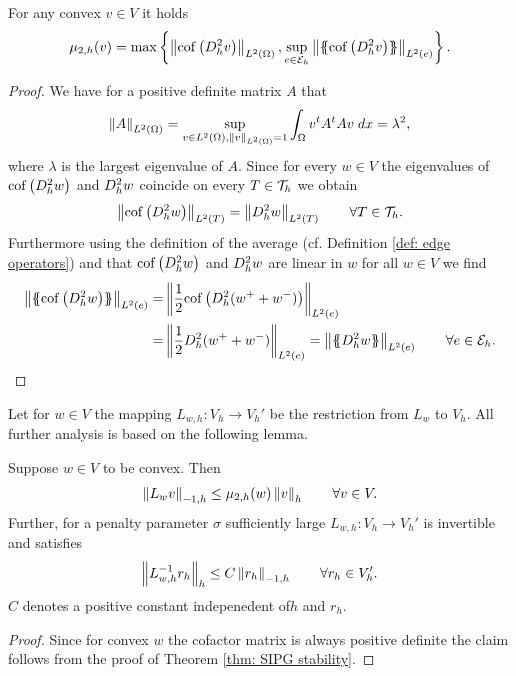 \begin{lemma} \label{la: epsilon cof hess equal}
	For any convex $v \in V$ it holds
	\[
		\mu_{2,h}(v) = \operatorname{max} \left\{  \left\lVert \operatorname{cof} \left( D_h^2 v \right) \right\rVert_{L^2(\Omega)},  \sup_{e \in \mathcal{E}_h} \left\lVert \{\!\!\{ \operatorname{cof} \left( D_h^2 v \right) \}\!\!\} \right\rVert_{L^2(e)} \right\} .
	\]
\end{lemma}
\begin{proof}
	We have for a positive definite matrix $A$ that 
	\begin{align*}
	\left\lVert A \right\rVert_{L^2(\Omega)} =  \sup_{v \in L^2(\Omega), \left\lVert v \right\rVert_{L^2(\Omega)}=1} \int_{\Omega} {{v^t A^t A v}\;dx} = \lambda^2,
	\end{align*}
	where $\lambda$ is the largest eigenvalue of $A$. Since for every $w \in V$ the eigenvalues of $\operatorname{cof} \left( D_h^2 w \right)$ and $D_h^2 w$ coincide on every $T \in \mathcal{T}_h$ we obtain 
	\begin{align}
	\left\lVert \operatorname{cof} \left( D_h^2 w \right) \right\rVert_{L^2(T)} = \left\lVert D_h^2 w \right\rVert_{L^2(T)} \qquad \forall T \in \mathcal{T}_h.\label{eq: equality norm}
	\end{align}
	Furthermore using the definition of the average (cf. Definition \ref{def: edge operators}) and that $\operatorname{cof} \left( D_h^2 w \right)$ and $D_h^2 w$ are linear in $w$ for all $w \in V$ we find
	\begin{align}
	\LTwonormE{\average {\cofHessH{w}}} 
	=& \LTwonormE{\frac 1 2 {\cofHessH{(w^+ + w^-)}}} \nonumber\\
	=& \LTwonormE{\frac 1 2 {\hess{(w^+ + w^-)}}} 
	= \LTwonormE{\average {\hess{w}}} \qquad \forall e \in \edges. \label{eq: equality norm average}
	\end{align}
	\phantom{blub}
\end{proof}

Let for $w \in V$ the mapping $L_{w,h}:V_h \rightarrow V_h'$ be the restriction from $L_w$ to $V_h$. All further analysis is based on the following lemma.
\begin{lemma}[Stability] \label{la: stability L}
	Suppose $w \in V$ to be convex. Then 
	\begin{align}
		\left\lVert L_{w}v \right\rVert_{-1,h} \leq \mu_{2,h}(w) \left\lVert v \right\rVert_{h} \qquad \forall v \in V.
	\end{align}
	Further, for a penalty parameter $\sigma $ sufficiently large $L_{w,h}: V_h \rightarrow V_h'$ is invertible and satisfies
	\begin{align}
		\left\lVert L_{w,h}^{-1} r_h \right\rVert_{h} \leq C \left\lVert r_h \right\rVert_{-1,h} \qquad \forall r_h \in V_h'.
	\end{align}
	$C$ denotes a positive constant indepenedent of$h$ and $r_h$. 
\end{lemma}
\begin{proof}
	Since for convex $w$ the cofactor matrix is always positive definite the claim follows from the proof of Theorem \ref{thm: SIPG stability}.
\end{proof}

